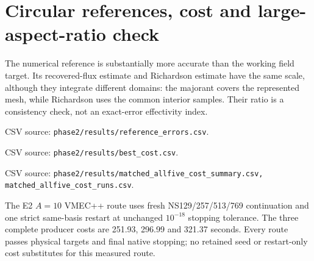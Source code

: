 \documentclass[10pt,a4paper]{article}
\newcommand{\dataref}[1]{{\footnotesize CSV source: \texttt{#1}}}
\newcommand{\pageheading}[1]{\clearpage\section{#1}}
\begin{document}
\pageheading{Circular references, cost and large-aspect-ratio check}
The numerical reference is substantially more accurate than the working field
target. Its recovered-flux estimate and Richardson estimate have the same
scale, although they integrate different domains: the majorant covers the
represented mesh, while Richardson uses the common interior samples. Their
ratio is a consistency check, not an exact-error effectivity index.

\begin{center}\small

\end{center}
\dataref{phase2/results/reference\_errors.csv}.

\begin{center}\small

\end{center}
\dataref{phase2/results/best\_cost.csv}.

\begin{center}\small
\resizebox{\textwidth}{!}{}
\end{center}
\dataref{phase2/results/matched\_allfive\_cost\_summary.csv,
matched\_allfive\_cost\_runs.csv}.

The E2 $A=10$ VMEC++ route uses fresh NS129/257/513/769 continuation
and one strict same-basis restart at unchanged $10^{-18}$ stopping tolerance.
The three complete producer costs are 251.93, 296.99 and 321.37 seconds.
Every route passes physical targets and final native stopping; no retained
seed or restart-only cost substitutes for this measured route.
\end{document}
